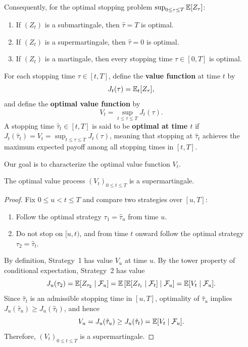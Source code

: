 Consequently, for the optimal stopping problem $\sup_{0 \le \tau \le T} \mathbb{E}[Z_\tau]$:
\begin{enumerate}
    \item If $(Z_t)$ is a submartingale, then $\hat{\tau} = T$ is optimal.
    \item If $(Z_t)$ is a supermartingale, then $\hat{\tau} = 0$ is optimal.
    \item If $(Z_t)$ is a martingale, then every stopping time $\tau \in [0, T]$ is optimal.
\end{enumerate}

\begin{definition}\label{def:value-function}
    For each stopping time $\tau \in [t, T]$, define the \textbf{value function} at time $t$ by
    \[
    J_t(\tau) = \mathbb{E}_t[Z_\tau],
    \]
    and define the \textbf{optimal value function} by
    \[
    V_t = \sup_{t \le \tau \le T} J_t(\tau).
    \]
    A stopping time $\hat{\tau}_t \in [t, T]$ is said to be \textbf{optimal at time $t$} if $J_t(\hat{\tau}_t) = V_t = \sup_{t \le \tau \le T} J_t(\tau)$, meaning that stopping at $\hat{\tau}_t$ achieves the maximum expected payoff among all stopping times in $[t, T]$.
\end{definition}

Our goal is to characterize the optimal value function $V_t$.

\begin{theorem}\label{thm:value-supermartingale}
    The optimal value process $(V_t)_{0 \le t \le T}$ is a supermartingale.
\end{theorem}
\begin{proof}
    Fix $0 \le u < t \le T$ and compare two strategies over $[u, T]$:
    \begin{enumerate}
        \item Follow the optimal strategy $\tau_1 = \hat{\tau}_u$ from time $u$.
        \item Do not stop on $[u, t)$, and from time $t$ onward follow the optimal strategy $\tau_2 = \hat{\tau}_t$.
    \end{enumerate}
    By definition, Strategy~1 has value $V_u$ at time $u$. By the tower property of conditional expectation, Strategy~2 has value
    \[
    J_u(\tau_2) = \mathbb{E}[Z_{\tau_2} \mid \mathcal{F}_u] = \mathbb{E}\left[\mathbb{E}[Z_{\hat{\tau}_t} \mid \mathcal{F}_t] \mid \mathcal{F}_u\right] = \mathbb{E}[V_t \mid \mathcal{F}_u].
    \]
    Since $\hat{\tau}_t$ is an admissible stopping time in $[u, T]$, optimality of $\hat{\tau}_u$ implies $J_u(\hat{\tau}_u) \ge J_u(\hat{\tau}_t)$, and hence
    \[
    V_u = J_u(\hat{\tau}_u) \ge J_u(\hat{\tau}_t) = \mathbb{E}[V_t \mid \mathcal{F}_u].
    \]
    Therefore, $(V_t)_{0 \le t \le T}$ is a supermartingale.
\end{proof}

